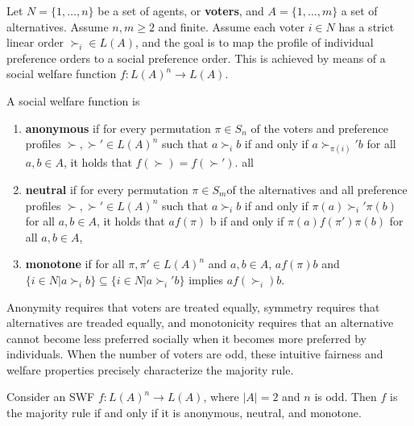 \begin{defn}
  \label{sec:social-choice-1}
  Let $N = \{ 1, \dots, n \} $ be a set of agents, or \textbf{voters},
  and $A = \{ 1, \dots, m \} $ a set of alternatives. Assume $n, m
  \geq 2$ and finite. Assume each voter $i \in N$ has a strict linear
  order $\succ_{i} \in L(A)$, and the goal is to map the profile of
  individual preference orders to a social preference order. This is
  achieved by means of a social welfare function $f: L(A)^{n}
  \rightarrow L(A)$.

  A social welfare function is
  \begin{enumerate}
  \item \textbf{anonymous} if for every permutation $\pi \in S_{n}$ of
    the voters and preference profiles $\succ, \succ' \in L(A)^{n}$
    such that $a \succ_{i} b$ if and only if $a \succ_{\pi(i)}' b$ for
    all $a, b \in A$, it holds that $f(\succ) = f(\succ')$.
    all
  \item \textbf{neutral} if for every permutation $\pi \in S_{m}$of
    the alternatives and all preference profiles $\succ, \succ' \in
    L(A)^{n}$ such that $a \succ_{i} b $ if and only if
    $\pi(a)\succ_{i}' \pi(b)$ for all $a, b \in A$, it holds that $a
    f(\pi)$ b if and only if $\pi(a) f(\pi') \pi(b)$ for all $a, b \in
    A$,
  \item \textbf{monotone} if for all $\pi, \pi' \in L(A)^{n}$ and $a,
    b \in A$, $a f(\pi) b $ and $\{ i \in N | a \succ_{i} b \}
    \subseteq \{ i \in N | a \succ_{i}' b \}$ implies $a f(\succ_{i}) b$.
  \end{enumerate}
\end{defn}

  Anonymity requires that voters are treated equally, symmetry
requires that alternatives are treaded equally, and monotonicity
requires that an alternative cannot become less preferred socially
when it becomes more preferred by individuals. When the number of
voters are odd, these intuitive fairness and welfare properties
precisely characterize the majority rule.

\begin{thm}
  \label{sec:social-choice-3}
  Consider an SWF $f: L(A)^{n} \rightarrow L(A)$, where $|A| = 2$ and
  $n$ is odd.  Then $f$ is the majority rule if and only if it is
  anonymous, neutral, and monotone.
\end{thm}

